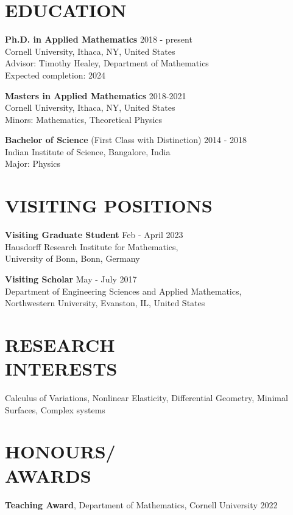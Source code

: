 \documentclass[margin]{res} %
\begin{document}
\begin{resume}

\section{EDUCATION}  
\textbf{Ph.D. in Applied Mathematics} \hfill 2018 - present\\
Cornell University, Ithaca, NY, United States\\
Advisor: Timothy Healey, Department of Mathematics\\
Expected completion: 2024
\smallskip

\textbf{Masters in Applied Mathematics} \hfill 2018-2021\\
Cornell University, Ithaca, NY, United States\\
Minors: Mathematics, Theoretical Physics
\smallskip

\textbf{Bachelor of Science} (First Class with Distinction) \hfill 2014 - 2018 \\
Indian Institute of Science, Bangalore, India\\
Major: Physics\\

\section{VISITING POSITIONS}
\textbf{Visiting Graduate Student} \hfill Feb - April 2023\\
Hausdorff Research Institute for Mathematics,\\
University of Bonn, Bonn, Germany
\smallskip

\textbf{Visiting Scholar} \hfill May - July 2017\\
Department of Engineering Sciences and Applied Mathematics,\\
Northwestern University, Evanston, IL, United States

\section{RESEARCH \\ INTERESTS} 

Calculus of Variations, Nonlinear Elasticity, Differential Geometry, Minimal Surfaces, Complex systems 
 
\section{HONOURS/\\AWARDS}
{\bf Teaching Award}, Department of Mathematics, Cornell University \hfill2022 


\end{resume}
\end{document}
